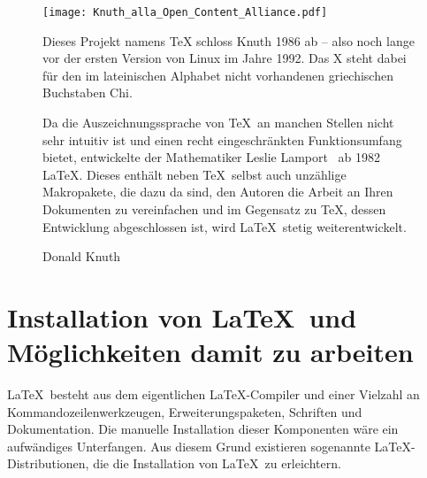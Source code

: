 \documentclass[a4paper,10pt,twoside]{scrbook}
\begin{document}
\begin{figure}[H]
	\begin{minipage}[t]{0.45\textwidth}
\vspace{-2mm}  
\texttt{[image: Knuth\_alla\_Open\_Content\_Alliance.pdf]}
\caption[Donald Knuth]{Donald Knuth\footnotemark}
\label{fig:DonaldKnuth}
	\end{minipage}
	\hfill
	\begin{minipage}[t]{0.5\textwidth}
\setlength{\parindent}{0pt}
\setlength{\parskip}{1.5ex plus 0.5ex minus 0.5ex}
Dieses Projekt namens TeX schloss Knuth 1986 ab -- also noch lange vor der ersten Version von Linux im Jahre 1992. Das X steht dabei für den im lateinischen Alphabet nicht vorhandenen griechischen Buchstaben Chi.

Da die Auszeichnungssprache von \TeX\ an manchen Stellen nicht sehr intuitiv ist und einen recht eingeschränkten Funktionsumfang bietet, entwickelte der Mathematiker Leslie Lamport~\cite{LeslieLamportWebpage} ab 1982 \LaTeX. Dieses enthält neben \TeX\ selbst auch unzählige Makropakete, die dazu da sind, den Autoren die Arbeit an Ihren Dokumenten zu vereinfachen und im Gegensatz zu \TeX, dessen Entwicklung abgeschlossen ist, wird \LaTeX\ stetig weiterentwickelt.
	\end{minipage}

\end{figure}







\section{Installation von \LaTeX\ und Möglichkeiten damit zu arbeiten}
\label{AbschnittInstallation}

\LaTeX\ besteht aus dem eigentlichen \LaTeX-Compiler und einer Vielzahl an Kommandozeilenwerkzeugen, Erweiterungspaketen, Schriften und Dokumentation. Die manuelle Installation dieser Komponenten wäre ein aufwändiges Unterfangen. Aus diesem Grund existieren sogenannte \LaTeX-Distributionen, die die Installation von \LaTeX\ zu erleichtern. 
\end{document}
